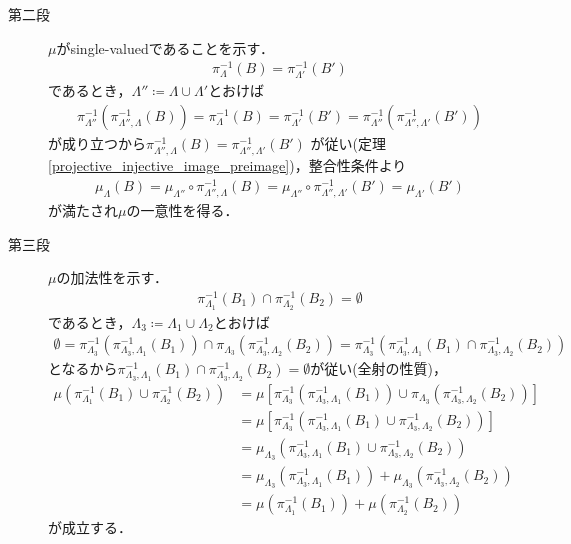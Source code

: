 \begin{prf}
\begin{description}
			\item[第二段]
				$\mu$がsingle-valuedであることを示す．
				\begin{align}
					\pi_\Lambda^{-1}(B) = \pi_{\Lambda'}^{-1}(B')
				\end{align}
				であるとき，$\Lambda'' \coloneqq \Lambda \cup \Lambda'$とおけば
				\begin{align}
					\pi_{\Lambda''}^{-1}\left( \pi_{\Lambda'',\Lambda}^{-1}(B) \right)
					= \pi_\Lambda^{-1}(B)
					= \pi_{\Lambda'}^{-1}(B')
					= \pi_{\Lambda''}^{-1}\left( \pi_{\Lambda'',\Lambda'}^{-1}(B') \right)
				\end{align}
				が成り立つから$\pi_{\Lambda'',\Lambda}^{-1}(B) = \pi_{\Lambda'',\Lambda'}^{-1}(B')$
				が従い(定理\ref{projective_injective_image_preimage})，整合性条件より
				\begin{align}
					\mu_\Lambda(B) 
					= \mu_{\Lambda''} \circ \pi_{\Lambda'',\Lambda}^{-1}(B)
					= \mu_{\Lambda''} \circ \pi_{\Lambda'',\Lambda'}^{-1}(B')
					= \mu_{\Lambda'}(B')
				\end{align}
				が満たされ$\mu$の一意性を得る．
				
			\item[第三段]
				$\mu$の加法性を示す．
				\begin{align}
					\pi_{\Lambda_1}^{-1}(B_1) \cap \pi_{\Lambda_2}^{-1}(B_2) = \emptyset
				\end{align}
				であるとき，$\Lambda_3 \coloneqq \Lambda_1 \cup \Lambda_2$とおけば
				\begin{align}
					\emptyset 
					= \pi_{\Lambda_3}^{-1}\left( \pi_{\Lambda_3,\Lambda_1}^{-1}(B_1) \right)
					\cap \pi_{\Lambda_3}\left( \pi_{\Lambda_3,\Lambda_2}^{-1}(B_2) \right)
					= \pi_{\Lambda_3}^{-1}\left( \pi_{\Lambda_3,\Lambda_1}^{-1}(B_1) \cap \pi_{\Lambda_3,\Lambda_2}^{-1}(B_2) \right)
				\end{align}
				となるから$\pi_{\Lambda_3,\Lambda_1}^{-1}(B_1) \cap \pi_{\Lambda_3,\Lambda_2}^{-1}(B_2)
				= \emptyset$が従い(全射の性質)，
				\begin{align}
					\mu\left( \pi_{\Lambda_1}^{-1}(B_1) \cup \pi_{\Lambda_2}^{-1}(B_2) \right)
					&= \mu\left[\pi_{\Lambda_3}^{-1}\left( \pi_{\Lambda_3,\Lambda_1}^{-1}(B_1) \right)
					\cup \pi_{\Lambda_3}\left( \pi_{\Lambda_3,\Lambda_2}^{-1}(B_2) \right) \right] \\
					&= \mu\left[ \pi_{\Lambda_3}^{-1}\left( \pi_{\Lambda_3,\Lambda_1}^{-1}(B_1) \cup \pi_{\Lambda_3,\Lambda_2}^{-1}(B_2) \right) \right] \\
					&= \mu_{\Lambda_3} \left( \pi_{\Lambda_3,\Lambda_1}^{-1}(B_1) \cup \pi_{\Lambda_3,\Lambda_2}^{-1}(B_2) \right) \\
					&= \mu_{\Lambda_3} \left( \pi_{\Lambda_3,\Lambda_1}^{-1}(B_1) \right)
						+ \mu_{\Lambda_3} \left( \pi_{\Lambda_3,\Lambda_2}^{-1}(B_2) \right) \\
					&= \mu\left( \pi_{\Lambda_1}^{-1}(B_1) \right)
						+ \mu\left( \pi_{\Lambda_2}^{-1}(B_2) \right)
				\end{align}
				が成立する．
		\end{description}
	\end{prf}